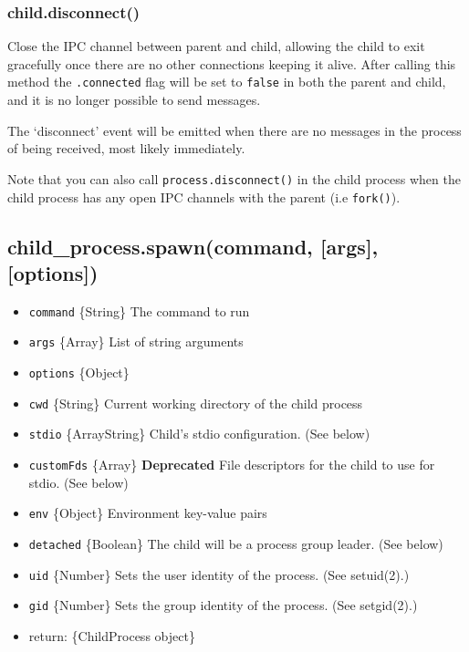 \subsubsection{child.disconnect()}\label{child.disconnect}

Close the IPC channel between parent and child, allowing the child to
exit gracefully once there are no other connections keeping it alive.
After calling this method the \texttt{.connected} flag will be set to
\texttt{false} in both the parent and child, and it is no longer
possible to send messages.

The `disconnect' event will be emitted when there are no messages in the
process of being received, most likely immediately.

Note that you can also call \texttt{process.disconnect()} in the child
process when the child process has any open IPC channels with the parent
(i.e \texttt{fork()}).

\subsection{child\_process.spawn(command, {[}args{]},
{[}options{]})}\label{childux5fprocess.spawncommand-args-options}

\begin{itemize}
\itemsep1pt\parskip0pt
\item
  \texttt{command} \{String\} The command to run
\item
  \texttt{args} \{Array\} List of string arguments
\item
  \texttt{options} \{Object\}
\item
  \texttt{cwd} \{String\} Current working directory of the child process
\item
  \texttt{stdio} \{Array\textbar{}String\} Child's stdio configuration.
  (See below)
\item
  \texttt{customFds} \{Array\} \textbf{Deprecated} File descriptors for
  the child to use for stdio. (See below)
\item
  \texttt{env} \{Object\} Environment key-value pairs
\item
  \texttt{detached} \{Boolean\} The child will be a process group
  leader. (See below)
\item
  \texttt{uid} \{Number\} Sets the user identity of the process. (See
  setuid(2).)
\item
  \texttt{gid} \{Number\} Sets the group identity of the process. (See
  setgid(2).)
\item
  return: \{ChildProcess object\}
\end{itemize}

